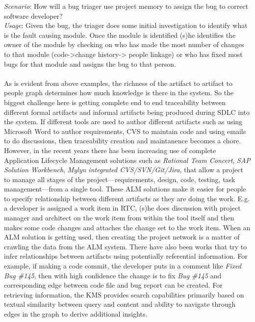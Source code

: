 \textit{Scenario}: How will a bug triager use project memory to assign the bug to correct software developer? \\
\textit{Usage}: Given the bug, the triager does some initial investigation to identify what is the fault causing module. Once the module is identified (s)he identifies the owner of the module by checking on who has made the most number of changes to that module (code->change history-> people linkage) or who has fixed most bugs for that module and assigns the bug to that person.
\\
\\
As is evident from above examples, the richness of the artifact to artifact to people graph determines how much knowledge is there in the system. So the biggest challenge here is getting complete end to end traceability between different formal artifacts and informal artifacts being produced during SDLC into the system. If different tools are used to author different artifacts such as using Microsoft Word to author requirements, CVS to maintain code and using emails to do discussions, then traceability creation and maintanence becomes a chore. However, in the recent years there has been increasing use of complete Application Lifecycle Management solutions such as \textit{Rational Team Concert}, \textit{SAP Solution Workbench}, \textit{Mylyn integrated CVS/SVN/Git/Jira}, that allow a project to manage all stages of the project---requirements, design, code, testing, task management---from a single tool. These ALM solutions make it easier for people to specify relationship between different artifacts as they are doing the work. E.g. a developer is assigned a work item in RTC, (s)he does discussion with project manager and architect on the work item from within the tool itself and then makes some code changes and attaches the change set to the work item.  When an ALM solution is getting used, then creating the project network is a matter of crawling the data from the ALM system. There have also been works that try to infer relationships between artifacts using potentially referential information\cite{}. For example, if making a code commit, the developer puts in a comment like \textit{Fixed Bug \#145}, then with high confidence the change is to fix \textit{Bug \#145} and corresponding edge between code file and bug report can be created. For retrieving information, the KMS provides search capabilities primarily based on textual similarity between query and content and ability to navigate through edges in the graph to derive additional insights. 

